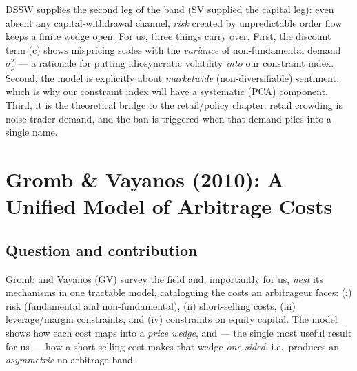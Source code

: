 \begin{takeaway}
DSSW supplies the second leg of the band (SV supplied the capital leg): even absent any capital-withdrawal channel, \emph{risk} created by unpredictable order flow keeps a finite wedge open. For us, three things carry over. First, the discount term (c) shows mispricing scales with the \emph{variance} of non-fundamental demand $\sigma_\rho^2$ --- a rationale for putting idiosyncratic volatility \emph{into} our constraint index. Second, the model is explicitly about \emph{marketwide} (non-diversifiable) sentiment, which is why our constraint index will have a systematic (PCA) component. Third, it is the theoretical bridge to the retail/policy chapter: retail crowding is noise-trader demand, and the ban is triggered when that demand piles into a single name.
\end{takeaway}

\section{Gromb \& Vayanos (2010): A Unified Model of Arbitrage Costs}
\label{sec:gv}

\subsection*{Question and contribution}
Gromb and Vayanos (GV) survey the field and, importantly for us, \emph{nest} its mechanisms in one tractable model, cataloguing the costs an arbitrageur faces: (i) risk (fundamental and non-fundamental), (ii) short-selling costs, (iii) leverage/margin constraints, and (iv) constraints on equity capital. The model shows how each cost maps into a \emph{price wedge}, and --- the single most useful result for us --- how a short-selling cost makes that wedge \emph{one-sided}, i.e.\ produces an \emph{asymmetric} no-arbitrage band.

